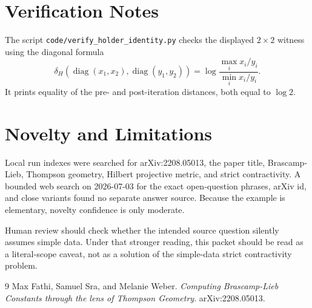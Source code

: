 \documentclass[11pt]{article}
\newcommand{\diag}{\operatorname{diag}}
\begin{document}
\section*{Verification Notes}

The script \texttt{code/verify\_holder\_identity.py} checks the displayed
$2\times 2$ witness using the diagonal formula
\[
  \delta_H(\diag(x_1,x_2),\diag(y_1,y_2))
  = \log\frac{\max_i x_i/y_i}{\min_i x_i/y_i}.
\]
It prints equality of the pre- and post-iteration distances, both equal to
$\log 2$.

\section*{Novelty and Limitations}

Local run indexes were searched for arXiv:2208.05013, the paper title,
Brascamp-Lieb, Thompson geometry, Hilbert projective metric, and strict
contractivity.  A bounded web search on 2026-07-03 for the exact
open-question phrases, arXiv id, and close variants found no separate answer
source.  Because the example is elementary, novelty confidence is only
moderate.

Human review should check whether the intended source question silently
assumes simple data.  Under that stronger reading, this packet should be read
as a literal-scope caveat, not as a solution of the simple-data strict
contractivity problem.

\begin{thebibliography}{9}
Max Fathi, Samuel Sra, and Melanie Weber.
\emph{Computing Brascamp-Lieb Constants through the lens of Thompson Geometry}.
arXiv:2208.05013.
\end{thebibliography}
\end{document}
